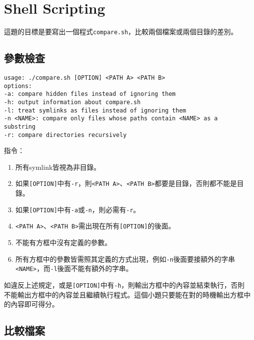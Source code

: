 \section{Shell Scripting}

這題的目標是要寫出一個程式\texttt{compare.sh}，比較兩個檔案或兩個目錄的差別。

\subsection{參數檢查}

\begin{lstlisting}
usage: ./compare.sh [OPTION] <PATH A> <PATH B>
options:
-a: compare hidden files instead of ignoring them
-h: output information about compare.sh
-l: treat symlinks as files instead of ignoring them
-n <NAME>: compare only files whose paths contain <NAME> as a substring
-r: compare directories recursively
\end{lstlisting}

指令：
\begin{enumerate}
\item 所有symlink皆視為非目錄。
\item 如果\texttt{[OPTION]}中有\texttt{-r}，則\texttt{<PATH A>}、\texttt{<PATH B>}都要是目錄，否則都不能是目錄。
\item 如果\texttt{[OPTION]}中有\texttt{-a}或\texttt{-n}，則必需有\texttt{-r}。
\item \texttt{<PATH A>}、\texttt{<PATH B>}需出現在所有\texttt{[OPTION]}的後面。
\item 不能有方框中沒有定義的參數。
\item 所有方框中的參數皆需照其定義的方式出現，例如\texttt{-n}後面要接額外的字串\texttt{<NAME>}，而\texttt{-l}後面不能有額外的字串。
\end{enumerate}

如違反上述規定，或是\texttt{[OPTION]}中有\texttt{-h}，則輸出方框中的內容並結束執行，否則不能輸出方框中的內容並且繼續執行程式。這個小題只要能在對的時機輸出方框中的內容即可得分。

\subsection{比較檔案}

